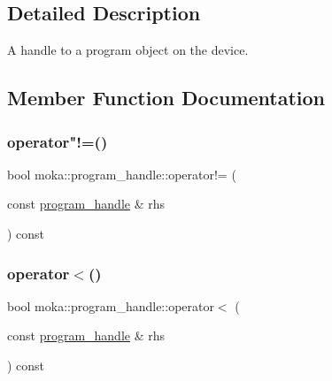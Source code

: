 \subsection{Detailed Description}
A handle to a program object on the device. 

\subsection{Member Function Documentation}
\mbox{\label{structmoka_1_1program__handle_a2588f54655c29f6db262bd357dcb5566}} 
\subsubsection{\texorpdfstring{operator"!=()}{operator!=()}}
{\footnotesize\ttfamily bool moka\+::program\+\_\+handle\+::operator!= (\begin{DoxyParamCaption}\item[{const \mbox{\hyperlink{structmoka_1_1program__handle}{program\+\_\+handle}} \&}]{rhs }\end{DoxyParamCaption}) const\hspace{0.3cm}{\ttfamily [inline]}}

\mbox{\label{structmoka_1_1program__handle_a3ea181eb3dcf9328e541baecfdbe7337}} 
\subsubsection{\texorpdfstring{operator$<$()}{operator<()}}
{\footnotesize\ttfamily bool moka\+::program\+\_\+handle\+::operator$<$ (\begin{DoxyParamCaption}\item[{const \mbox{\hyperlink{structmoka_1_1program__handle}{program\+\_\+handle}} \&}]{rhs }\end{DoxyParamCaption}) const\hspace{0.3cm}{\ttfamily [inline]}}

\mbox{\label{structmoka_1_1program__handle_a8e91781438aaf79dffaa50092954f7bf}} 
